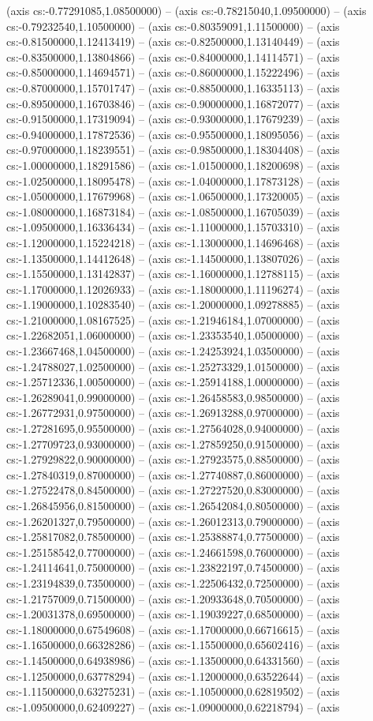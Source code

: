 (axis cs:-0.77291085,1.08500000) -- (axis cs:-0.78215040,1.09500000) -- (axis cs:-0.79232540,1.10500000) -- (axis cs:-0.80359091,1.11500000) -- (axis cs:-0.81500000,1.12413419) -- (axis cs:-0.82500000,1.13140449) -- (axis cs:-0.83500000,1.13804866) -- (axis cs:-0.84000000,1.14114571) -- (axis cs:-0.85000000,1.14694571) -- (axis cs:-0.86000000,1.15222496) -- (axis cs:-0.87000000,1.15701747) -- (axis cs:-0.88500000,1.16335113) -- (axis cs:-0.89500000,1.16703846) -- (axis cs:-0.90000000,1.16872077) -- (axis cs:-0.91500000,1.17319094) -- (axis cs:-0.93000000,1.17679239) -- (axis cs:-0.94000000,1.17872536) -- (axis cs:-0.95500000,1.18095056) -- (axis cs:-0.97000000,1.18239551) -- (axis cs:-0.98500000,1.18304408) -- (axis cs:-1.00000000,1.18291586) -- (axis cs:-1.01500000,1.18200698) -- (axis cs:-1.02500000,1.18095478) -- (axis cs:-1.04000000,1.17873128) -- (axis cs:-1.05000000,1.17679968) -- (axis cs:-1.06500000,1.17320005) -- (axis cs:-1.08000000,1.16873184) -- (axis cs:-1.08500000,1.16705039) -- (axis cs:-1.09500000,1.16336434) -- (axis cs:-1.11000000,1.15703310) -- (axis cs:-1.12000000,1.15224218) -- (axis cs:-1.13000000,1.14696468) -- (axis cs:-1.13500000,1.14412648) -- (axis cs:-1.14500000,1.13807026) -- (axis cs:-1.15500000,1.13142837) -- (axis cs:-1.16000000,1.12788115) -- (axis cs:-1.17000000,1.12026933) -- (axis cs:-1.18000000,1.11196274) -- (axis cs:-1.19000000,1.10283540) -- (axis cs:-1.20000000,1.09278885) -- (axis cs:-1.21000000,1.08167525) -- (axis cs:-1.21946184,1.07000000) -- (axis cs:-1.22682051,1.06000000) -- (axis cs:-1.23353540,1.05000000) -- (axis cs:-1.23667468,1.04500000) -- (axis cs:-1.24253924,1.03500000) -- (axis cs:-1.24788027,1.02500000) -- (axis cs:-1.25273329,1.01500000) -- (axis cs:-1.25712336,1.00500000) -- (axis cs:-1.25914188,1.00000000) -- (axis cs:-1.26289041,0.99000000) -- (axis cs:-1.26458583,0.98500000) -- (axis cs:-1.26772931,0.97500000) -- (axis cs:-1.26913288,0.97000000) -- (axis cs:-1.27281695,0.95500000) -- (axis cs:-1.27564028,0.94000000) -- (axis cs:-1.27709723,0.93000000) -- (axis cs:-1.27859250,0.91500000) -- (axis cs:-1.27929822,0.90000000) -- (axis cs:-1.27923575,0.88500000) -- (axis cs:-1.27840319,0.87000000) -- (axis cs:-1.27740887,0.86000000) -- (axis cs:-1.27522478,0.84500000) -- (axis cs:-1.27227520,0.83000000) -- (axis cs:-1.26845956,0.81500000) -- (axis cs:-1.26542084,0.80500000) -- (axis cs:-1.26201327,0.79500000) -- (axis cs:-1.26012313,0.79000000) -- (axis cs:-1.25817082,0.78500000) -- (axis cs:-1.25388874,0.77500000) -- (axis cs:-1.25158542,0.77000000) -- (axis cs:-1.24661598,0.76000000) -- (axis cs:-1.24114641,0.75000000) -- (axis cs:-1.23822197,0.74500000) -- (axis cs:-1.23194839,0.73500000) -- (axis cs:-1.22506432,0.72500000) -- (axis cs:-1.21757009,0.71500000) -- (axis cs:-1.20933648,0.70500000) -- (axis cs:-1.20031378,0.69500000) -- (axis cs:-1.19039227,0.68500000) -- (axis cs:-1.18000000,0.67549608) -- (axis cs:-1.17000000,0.66716615) -- (axis cs:-1.16500000,0.66328286) -- (axis cs:-1.15500000,0.65602416) -- (axis cs:-1.14500000,0.64938986) -- (axis cs:-1.13500000,0.64331560) -- (axis cs:-1.12500000,0.63778294) -- (axis cs:-1.12000000,0.63522644) -- (axis cs:-1.11500000,0.63275231) -- (axis cs:-1.10500000,0.62819502) -- (axis cs:-1.09500000,0.62409227) -- (axis cs:-1.09000000,0.62218794) -- (axis 